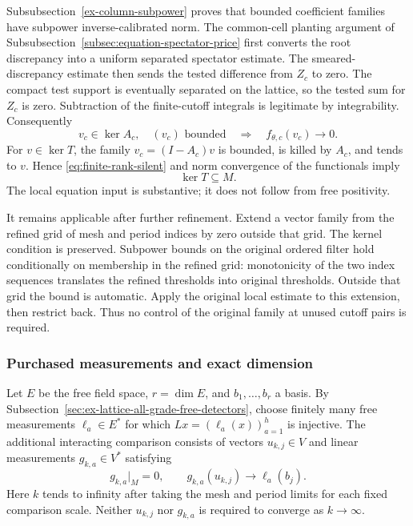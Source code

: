 Subsubsection~\ref{ex-column-subpower} proves that bounded coefficient
families have subpower inverse-calibrated norm. The common-cell planting
argument of Subsubsection~\ref{subsec:equation-spectator-price} first converts
the root discrepancy into a uniform separated spectator estimate. The
smeared-discrepancy estimate then sends the tested difference from $Z_c$
to zero. The compact
test support is eventually separated on the lattice, so the tested
sum for $Z_c$ is zero. Subtraction of the finite-cutoff integrals is
legitimate by integrability. Consequently
\begin{equation}\label{eq:finite-rank-silent}
 v_c\in\ker A_c,\quad (v_c)\text{ bounded}
       \quad\Longrightarrow\quad f_{\theta,c}(v_c)\longrightarrow0.
\end{equation}
For $v\in\ker T$, the family $v_c=(I-A_c)v$ is bounded, is killed by
$A_c$, and tends to $v$. Hence \eqref{eq:finite-rank-silent} and norm
convergence of the functionals imply
\begin{equation}\label{eq:finite-rank-upper-kernel}
                             \ker T\subseteq M.
\end{equation}
The local equation input is substantive; it does not follow from free
positivity.

It remains applicable after further refinement. Extend a vector family
from the refined grid of mesh and period indices by zero outside that grid. The kernel
condition is preserved. Subpower bounds on the original ordered filter
hold conditionally on membership in the refined grid: monotonicity of
the two index sequences translates the refined thresholds into original
thresholds. Outside that grid the bound is automatic. Apply the original
local estimate to this extension, then restrict back. Thus no control
of the original family at unused cutoff pairs is required.

\subsubsection{Purchased measurements and exact dimension}

Let $E$ be the free field space, $r=\dim E$, and $b_1,\ldots,b_r$ a
basis. By Subsection~\ref{sec:ex-lattice-all-grade-free-detectors}, choose
finitely many free measurements $\ell_a\in E^*$ for which
$Lx=(\ell_a(x))_{a=1}^h$ is injective. The additional interacting
comparison consists of vectors $u_{k,j}\in V$ and linear measurements
$g_{k,a}\in V^*$ satisfying
\begin{equation}\label{eq:finite-rank-purchased-matrix}
 g_{k,a}|_M=0,\qquad
             g_{k,a}(u_{k,j})\longrightarrow\ell_a(b_j).
\end{equation}
Here $k$ tends to infinity after taking the mesh and period limits for
each fixed comparison scale. Neither $u_{k,j}$ nor $g_{k,a}$ is required
to converge as $k\to\infty$.

